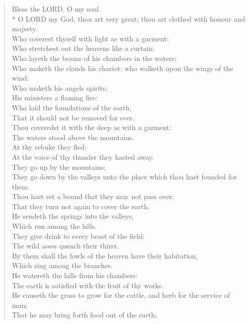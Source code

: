 \documentclass[MAIN]{subfiles}
\begin{document}
\begin{verse}
Bless the {\hge LORD}, O my soul.\\*
\vin O {\hge LORD} my God, thou art very great; thou art clothed with honour and majesty.\\
Who coverest thyself with light as with a garment:\\
\vin Who stretchest out the heavens like a curtain:\\
Who layeth the beams of his chambers in the waters:\\
\vin Who maketh the clouds his chariot: who walketh upon the wings of the wind:\\
Who maketh his angels spirits;\\
\vin His ministers a flaming fire:\\
Who laid the foundations of the earth,\\
\vin That it should not be removed for ever.\\
Thou coveredst it with the deep as with a garment:\\
\vin The waters stood above the mountains.\\
At thy rebuke they fled;\\
\vin At the voice of thy thunder they hasted away.\\
They go up by the mountains;\\
\vin They go down by the valleys unto the place which thou hast founded for them.\\
Thou hast set a bound that they may not pass over;\\
\vin That they turn not again to cover the earth.\\
He sendeth the springs into the valleys,\\
\vin Which run among the hills.\\
They give drink to every beast of the field:\\
\vin The wild asses quench their thirst.\\
By them shall the fowls of the heaven have their habitation,\\
\vin Which sing among the branches.\\
He watereth the hills from his chambers:\\
\vin The earth is satisfied with the fruit of thy works.\\
He causeth the grass to grow for the cattle, and herb for the service of man:\\
\vin That he may bring forth food out of the earth;\\

\end{verse}
\end{document}
